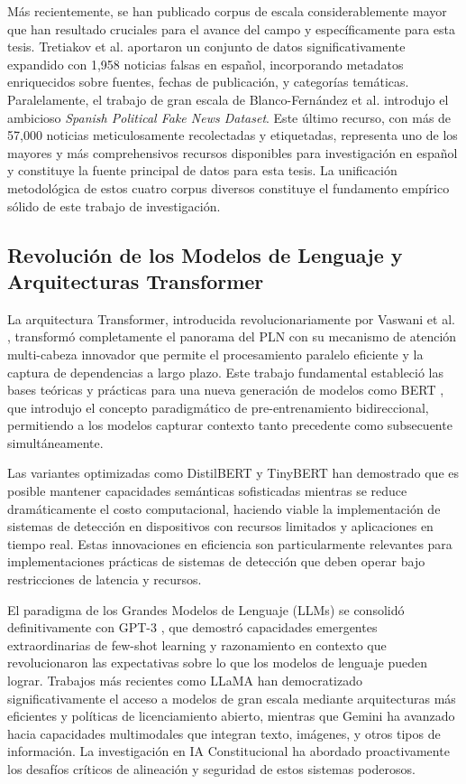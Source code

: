 Más recientemente, se han publicado corpus de escala considerablemente mayor que han resultado cruciales para el avance del campo y específicamente para esta tesis. Tretiakov et al. \cite{tretiakov2022detection} aportaron un conjunto de datos significativamente expandido con 1,958 noticias falsas en español, incorporando metadatos enriquecidos sobre fuentes, fechas de publicación, y categorías temáticas. Paralelamente, el trabajo de gran escala de Blanco-Fernández et al. \cite{blanco2024enhancing} introdujo el ambicioso \textit{Spanish Political Fake News Dataset}. Este último recurso, con más de 57,000 noticias meticulosamente recolectadas y etiquetadas, representa uno de los mayores y más comprehensivos recursos disponibles para investigación en español y constituye la fuente principal de datos para esta tesis. La unificación metodológica de estos cuatro corpus diversos constituye el fundamento empírico sólido de este trabajo de investigación.

\subsection{Revolución de los Modelos de Lenguaje y Arquitecturas Transformer}

La arquitectura Transformer, introducida revolucionariamente por Vaswani et al. \cite{vaswani2017attention}, transformó completamente el panorama del PLN con su mecanismo de atención multi-cabeza innovador que permite el procesamiento paralelo eficiente y la captura de dependencias a largo plazo. Este trabajo fundamental estableció las bases teóricas y prácticas para una nueva generación de modelos como BERT \cite{devlin2018bert}, que introdujo el concepto paradigmático de pre-entrenamiento bidireccional, permitiendo a los modelos capturar contexto tanto precedente como subsecuente simultáneamente.

Las variantes optimizadas como DistilBERT \cite{sanh2019distilbert} y TinyBERT \cite{jiao2019tinybert} han demostrado que es posible mantener capacidades semánticas sofisticadas mientras se reduce dramáticamente el costo computacional, haciendo viable la implementación de sistemas de detección en dispositivos con recursos limitados y aplicaciones en tiempo real. Estas innovaciones en eficiencia son particularmente relevantes para implementaciones prácticas de sistemas de detección que deben operar bajo restricciones de latencia y recursos.

El paradigma de los Grandes Modelos de Lenguaje (LLMs) se consolidó definitivamente con GPT-3 \cite{brown2020language}, que demostró capacidades emergentes extraordinarias de few-shot learning y razonamiento en contexto que revolucionaron las expectativas sobre lo que los modelos de lenguaje pueden lograr. Trabajos más recientes como LLaMA \cite{touvron2023llama} han democratizado significativamente el acceso a modelos de gran escala mediante arquitecturas más eficientes y políticas de licenciamiento abierto, mientras que Gemini \cite{gemini2023family} ha avanzado hacia capacidades multimodales que integran texto, imágenes, y otros tipos de información. La investigación en IA Constitucional \cite{bai2022constitutional} ha abordado proactivamente los desafíos críticos de alineación y seguridad de estos sistemas poderosos.

